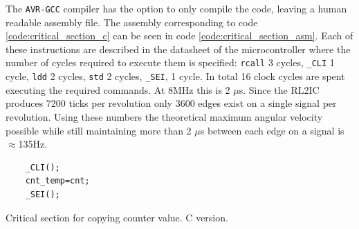 The \texttt{AVR-GCC} compiler has the option to only compile the code, leaving a human readable assembly file.
The assembly corresponding to code \ref{code:critical_section_c} can be seen in code \ref{code:critical_section_asm}.
Each of these instructions are described in the datasheet of the microcontroller where the number of cycles required to execute them is specified: \texttt{rcall} 3 cycles, \texttt{\_CLI} 1 cycle, \texttt{ldd} 2 cycles, \texttt{std} 2 cycles, \texttt{\_SEI}, 1 cycle.
In total 16 clock cycles are spent executing the required commands.
At 8MHz this is 2 $\mu$s.
Since the RL2IC produces 7200 ticks per revolution only 3600 edges exist on a single signal per revolution. 
Using these numbers the theoretical maximum angular velocity possible while still maintaining more than 2 $\mu$s between each edge on a signal is $\approx$135Hz.

\begin{listing}[h]
\begin{verbatim}
	_CLI();
	cnt_temp=cnt;
	_SEI();
\end{verbatim}
\caption{Critical section for copying counter value. C version.}
\label{code:critical_section_c}
\end{listing}

